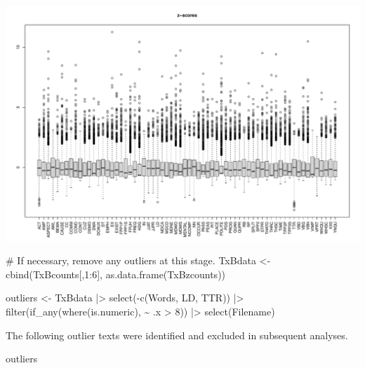\documentclass[
  letterpaper,
  DIV=11,
  numbers=noendperiod]{scrreprt}
\newenvironment{Shaded}{\begin{snugshade}}{\end{snugshade}}
\newcommand{\CommentTok}[1]{\textcolor[rgb]{0.37,0.37,0.37}{#1}}
\newcommand{\DecValTok}[1]{\textcolor[rgb]{0.68,0.00,0.00}{#1}}
\newcommand{\FunctionTok}[1]{\textcolor[rgb]{0.28,0.35,0.67}{#1}}
\newcommand{\NormalTok}[1]{\textcolor[rgb]{0.00,0.23,0.31}{#1}}
\newcommand{\OtherTok}[1]{\textcolor[rgb]{0.00,0.23,0.31}{#1}}
\newcommand{\SpecialCharTok}[1]{\textcolor[rgb]{0.37,0.37,0.37}{#1}}
\begin{document}
\includegraphics{Ch6_data_prep_files/figure-pdf/z-standardisation-outliers-1.pdf}

\begin{Shaded}
\begin{Highlighting}[]
\CommentTok{\# If necessary, remove any outliers at this stage.}
\NormalTok{TxBdata }\OtherTok{\textless{}{-}} \FunctionTok{cbind}\NormalTok{(TxBcounts[,}\DecValTok{1}\SpecialCharTok{:}\DecValTok{6}\NormalTok{], }\FunctionTok{as.data.frame}\NormalTok{(TxBzcounts))}

\NormalTok{outliers }\OtherTok{\textless{}{-}}\NormalTok{ TxBdata }\SpecialCharTok{|\textgreater{}}  
  \FunctionTok{select}\NormalTok{(}\SpecialCharTok{{-}}\FunctionTok{c}\NormalTok{(Words, LD, TTR)) }\SpecialCharTok{|\textgreater{}}  
  \FunctionTok{filter}\NormalTok{(}\FunctionTok{if\_any}\NormalTok{(}\FunctionTok{where}\NormalTok{(is.numeric), }\SpecialCharTok{\textasciitilde{}}\NormalTok{ .x }\SpecialCharTok{\textgreater{}} \DecValTok{8}\NormalTok{)) }\SpecialCharTok{|\textgreater{}}  
  \FunctionTok{select}\NormalTok{(Filename)}
\end{Highlighting}
\end{Shaded}

The following outlier texts were identified and excluded in subsequent
analyses.

\begin{Shaded}
\begin{Highlighting}[]
\NormalTok{outliers}
\end{Highlighting}
\end{Shaded}
\end{document}
